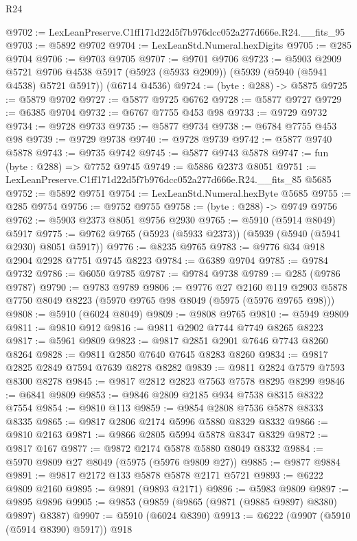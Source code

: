 \begin{lexlean}{R24}
\begin{coremodule}
@9702 := LexLeanPreserve.C1ff171d22d5f7b976dcc052a277d666e.R24.__fits_95
@9703 := @5892 @9702
@9704 := LexLeanStd.Numeral.hexDigits
@9705 := @285 @9704
@9706 := @9703 @9705
@9707 := @9701 @9706
@9723 := @5903
    @2909
    @5721
    @9706
    @4538
    @5917
    (@5923 (@5933 @2909))
    (@5939 (@5940 (@5941 @4538) @5721 @5917))
    (@6714 @4536)
@9724 := (byte : @288) -> @5875
@9725 := @5879 @9702
@9727 := @5877 @9725 @6762
@9728 := @5877 @9727
@9729 := @6385 @9704
@9732 := @6767 @7755 @453 @98
@9733 := @9729 @9732
@9734 := @9728 @9733
@9735 := @5877 @9734
@9738 := @6784 @7755 @453 @98
@9739 := @9729 @9738
@9740 := @9728 @9739
@9742 := @5877 @9740 @5878
@9743 := @9735 @9742
@9745 := @5877 @9743 @5878
@9747 := fun (byte : @288) => @7752 @9745
@9749 := @5886 @2373 @8051
@9751 := LexLeanPreserve.C1ff171d22d5f7b976dcc052a277d666e.R24.__fits_85 @5685
@9752 := @5892 @9751
@9754 := LexLeanStd.Numeral.hexByte @5685
@9755 := @285 @9754
@9756 := @9752 @9755
@9758 := (byte : @288) -> @9749 @9756
@9762 := @5903 @2373 @8051 @9756 @2930
@9765 := @5910 (@5914 @8049) @5917
@9775 := @9762 @9765 (@5923 (@5933 @2373)) (@5939 (@5940 (@5941 @2930) @8051 @5917))
@9776 := @8235 @9765
@9783 := @9776 @34 @918 @2904 @2928 @7751 @9745 @8223
@9784 := @6389 @9704
@9785 := @9784 @9732
@9786 := @6050 @9785
@9787 := @9784 @9738
@9789 := @285 (@9786 @9787)
@9790 := @9783 @9789
@9806 := @9776
    @27
    @2160
    @119
    @2903
    @5878
    @7750
    @8049
    @8223
    (@5970 @9765 @98 @8049 (@5975 (@5976 @9765 @98)))
@9808 := @5910 (@6024 @8049)
@9809 := @9808 @9765
@9810 := @5949 @9809
@9811 := @9810 @912
@9816 := @9811 @2902 @7744 @7749 @8265 @8223
@9817 := @5961 @9809
@9823 := @9817 @2851 @2901 @7646 @7743 @8260 @8264
@9828 := @9811 @2850 @7640 @7645 @8283 @8260
@9834 := @9817 @2825 @2849 @7594 @7639 @8278 @8282
@9839 := @9811 @2824 @7579 @7593 @8300 @8278
@9845 := @9817 @2812 @2823 @7563 @7578 @8295 @8299
@9846 := @6841 @9809
@9853 := @9846 @2809 @2185 @934 @7538 @8315 @8322 @7554
@9854 := @9810 @113
@9859 := @9854 @2808 @7536 @5878 @8333 @8335
@9865 := @9817 @2806 @2174 @5996 @5880 @8329 @8332
@9866 := @9810 @2163
@9871 := @9866 @2805 @5994 @5878 @8347 @8329
@9872 := @9817 @167
@9877 := @9872 @2174 @5878 @5880 @8049 @8332
@9884 := @5970 @9809 @27 @8049 (@5975 (@5976 @9809 @27))
@9885 := @9877 @9884
@9891 := @9817 @2172 @133 @5878 @5878 @2171 @5721
@9893 := @6222 @9809 @2160
@9895 := @9891 (@9893 @2171)
@9896 := @5983 @9809
@9897 := @9895 @9896
@9905 := @9853 (@9859 (@9865 (@9871 (@9885 @9897) @8380) @9897) @8387)
@9907 := @5910 (@6024 @8390)
@9913 := @6222 (@9907 (@5910 (@5914 @8390) @5917)) @918

\end{coremodule}
\end{lexlean}
